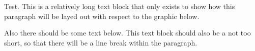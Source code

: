 \documentclass[a4paper]{article}
\begin{document}
Test. This is a relatively long text block that only exists
to show how this paragraph will be layed out with respect to 
the graphic below.
\begin{center}

\end{center}
Also there should be some text below. This text block
should also be a not too short, so that there will be a line
break within the paragraph.
\end{document}
